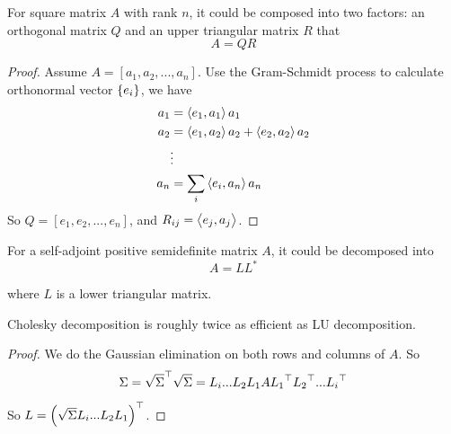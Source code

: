 \begin{theorem}[QR Decomposition]
    For square matrix $A$ with rank $n$, it could be composed into two factors: an orthogonal matrix $Q$ and an upper triangular matrix $R$ that 
    \begin{equation}
        A = QR
    \end{equation}
\end{theorem}
\begin{proof}
    Assume $A=[a_1, a_2, ..., a_n]$. Use the Gram-Schmidt process to calculate orthonormal vector $\set{e_i}$, we have
    \begin{equation*}
        \begin{aligned}
            a_1 &= \left\langle \displaystyle e_1, a_1 \right\rangle a_1 \\
            a_2 &= \left\langle \displaystyle e_1, a_2 \right\rangle a_2 + \left\langle \displaystyle e_2, a_2 \right\rangle a_2\\
            &\vdots \\
            a_n &= \sum_i \left\langle \displaystyle e_i, a_n \right\rangle a_n
        \end{aligned}
    \end{equation*}
    So $Q=[e_1, e_2, ..., e_n]$, and $R_{ij} = \left\langle \displaystyle e_j, a_j \right\rangle$.
\end{proof}

\begin{theorem}
    For a self-adjoint positive semidefinite matrix $A$, it could be decomposed into 
    \begin{equation}
        A = L L^*
    \end{equation}
    
    where $L$ is a lower triangular matrix.
    
    Cholesky decomposition is roughly twice as efficient as LU decomposition.
\end{theorem}
\begin{proof}
    We do the Gaussian elimination on both rows and columns of $A$. So 
    \begin{equation}
        \Sigma = {\sqrt{\Sigma}}^\top \sqrt{\Sigma} = L_i ... L_2 L_1 A {L_1}^\top {L_2}^\top ... {L_i}^\top
    \end{equation}
    
    So $L = {\left(\sqrt{\Sigma}L_i ... L_2 L_1\right)}^\top$.
\end{proof}

























